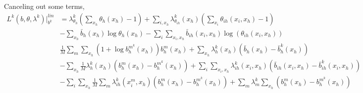\documentclass{article}
\begin{document}
Canceling out some terms,
\begin{align*}
L^k(b,\theta,\lambda^k)|_{b^k}^{lin}&=\lambda^k_{\theta_h}\left(\sum_{x_h}\theta_h(x_h)-1 \right)+\sum_{i, x_h}\lambda^k_{\theta_{ih}}(x_h)\left(\sum_{x_i}\theta_{ih}(x_i,x_h)-1\right)\\
&-\sum_{x_h}\bar{b}_h(x_h)\log \theta_h(x_h)-\sum_i\sum_{x_i,x_h} \bar{b}_{ih}(x_i,x_h)\log(\theta_{ih}(x_i,x_h))\\
&\frac{1}{M}\sum_m\sum_{x_h}(1+\log b_h^{m^k}(x_h))b_h^m(x_h)+\sum_{x_h}\lambda_h^k(x_h)(\bar{b}_h(x_h)-\bar{b}^k_h(x_h))\\
&-\sum_{x_h}\frac{1}{M}\lambda_h^k(x_h)(b_h^m(x_h)-b_h^{m^k}(x_h))+\sum_i\sum_{x_i,x_h}\lambda^k_{ih}(x_i,x_h)(\bar{b}_{ih}(x_i,x_h)-\bar{b}^k_{ih}(x_i,x_h))\\
&-\sum_i\sum_{x_h}\frac{1}{M}\sum_m\lambda^k_{ih}(x_i^m,x_h)(b_h^m(x_h)-b_h^{m^k}(x_h))+\sum_m\lambda_m^k\sum_{x_h}(b_h^m(x_h)-b_h^{m^k}(x_h))
\end{align*}
\end{document}
